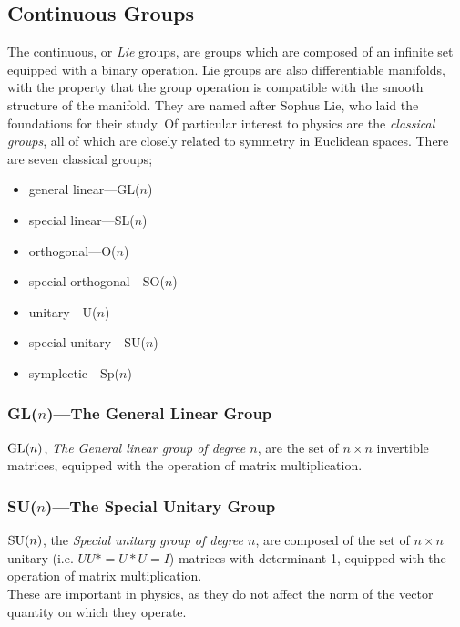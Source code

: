 \subsection{Continuous Groups}
\label{sec:contgroups}

The continuous, or \emph{Lie} groups, are groups which are composed of
an infinite set equipped with a binary operation. Lie groups are also
differentiable manifolds, with the property that the group operation
is compatible with the smooth structure of the manifold. They are
named after Sophus Lie, who laid the foundations for their study. Of
particular interest to physics are the \emph{classical groups}, all of which are closely related to symmetry in Euclidean spaces. There are seven classical groups; 
\begin{itemize}
\item general linear---GL($n$)
\item special linear---SL($n$)
\item orthogonal---O($n$)
\item special orthogonal---SO($n$)
\item unitary---U($n$)
\item special unitary---SU($n$)
\item symplectic---Sp($n$)
\end{itemize}

\subsubsection{GL($n$)---The General Linear Group}
\label{sec:genlinear}

${\rm GL}(n)$, \emph{The General linear group of degree $n$}, are the
set of $n\times n$ invertible matrices, equipped with the operation of
matrix multiplication.

\subsubsection{SU($n$)---The Special Unitary Group}
\label{sec:su3}

${\rm SU}(n)$, the \emph{Special unitary group of degree $n$}, are
composed of the set of $n\times n$ unitary (i.e. $UU* = U*U = I$)
matrices with determinant
1, equipped with the operation of matrix multiplication.\\
These are important in physics, as they do not affect the norm of the
vector quantity on which they operate.

